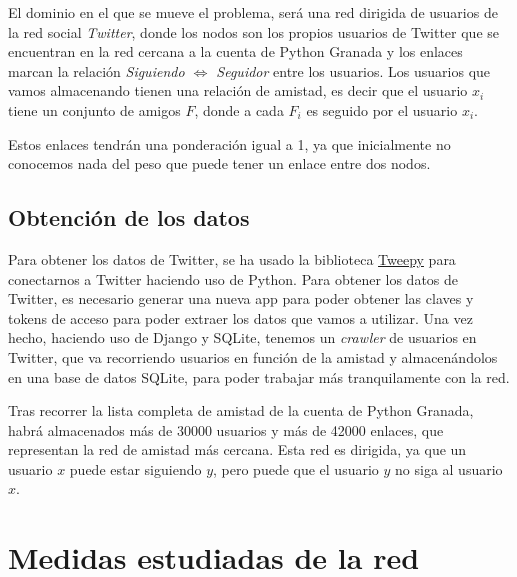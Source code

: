 \documentclass[paper=a4, fontsize=11pt]{article} %
\numberwithin{equation}{section} %
\numberwithin{figure}{section} %
\numberwithin{table}{section} %
\begin{document}
El dominio en el que se mueve el problema, será una red dirigida de usuarios de la red social \textit{Twitter}, donde los nodos son los propios usuarios de Twitter que se encuentran en la red cercana a la cuenta de Python Granada y los enlaces marcan la relación \textit{Siguiendo $\iff$ Seguidor} entre los usuarios. Los usuarios que vamos almacenando tienen una relación de amistad, es decir que el usuario $x_i$ tiene un conjunto de amigos $F$, donde a cada $F_i$ es seguido por el usuario $x_i$.

Estos enlaces tendrán una ponderación igual a 1, ya que inicialmente no conocemos nada del peso que puede tener un enlace entre dos nodos.

\subsection{Obtención de los datos}

Para obtener los datos de Twitter, se ha usado la biblioteca \href{http://www.tweepy.org/}{Tweepy} para conectarnos a Twitter haciendo uso de Python. Para obtener los datos de Twitter, es necesario generar una nueva app para poder obtener las claves y tokens de acceso para poder extraer los datos que vamos a utilizar. Una vez hecho, haciendo uso de Django y SQLite, tenemos un \textit{crawler} de usuarios en Twitter, que va recorriendo usuarios en función de la amistad y almacenándolos en una base de datos SQLite, para poder trabajar más tranquilamente con la red.

Tras recorrer la lista completa de amistad de la cuenta de Python Granada, habrá almacenados más de 30000 usuarios y más de 42000 enlaces, que representan la red de amistad más cercana. Esta red es dirigida, ya que un usuario $x$ puede estar siguiendo $y$, pero puede que el usuario $y$ no siga al usuario $x$.

\section{Medidas estudiadas de la red}
\end{document}
